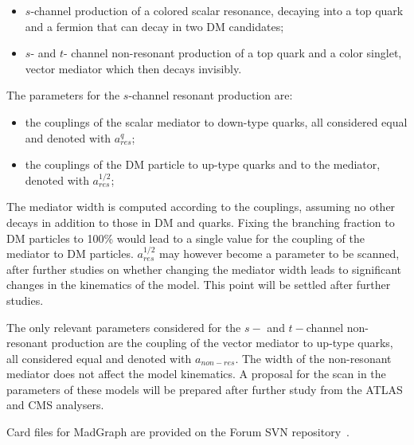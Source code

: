\documentclass[a4,debug,notitlepage,nobib]{tufte-handout}
\newif\ifATLAS
\newif\ifCMS
\begin{document}
\begin{itemize}
\item $s$-channel production of a colored scalar resonance, decaying into a top quark and a fermion
that can decay in two DM candidates;
\item $s$- and $t$- channel non-resonant production of a top quark and a color singlet, vector mediator which then decays invisibly.
\end{itemize}

The parameters for the $s$-channel resonant production are:
\begin{itemize}
 \item the couplings of the scalar mediator to down-type quarks, all considered equal and denoted with $a_{res}^q$;
 \item the couplings of the DM particle to up-type quarks and to the mediator, denoted with $a_{res}^{1/2}$;
\end{itemize}
The mediator width is computed according to the couplings, assuming no other decays in addition
to those in DM and quarks. Fixing the branching fraction to DM particles to 100\% would lead 
to a single value for the coupling of the mediator to DM particles. $a_{res}^{1/2}$ 
may however become a parameter to be scanned, after further studies on whether changing 
the mediator width leads to significant changes in the kinematics of the model. 
This point will be settled after further studies. 

The only relevant parameters considered for the $s-$ and $t-$channel non-resonant production 
are the coupling of the vector mediator to up-type quarks, all considered equal and denoted with $a_{non-res}$. 
The width of the non-resonant mediator does not affect the model kinematics. 
A proposal for the scan in the parameters of these models will be prepared after further study 
from the ATLAS and CMS analysers. 

Card files for MadGraph are provided on the Forum SVN repository~\cite{ForumSVN_EWMonoTop}.

% 

\ifATLAS
\textbf{[Open point: Add here implementation details for ATLAS.]}
\fi

\ifCMS
\textbf{[Open point: Add here implementation details for CMS..]}
\fi
\end{document}
